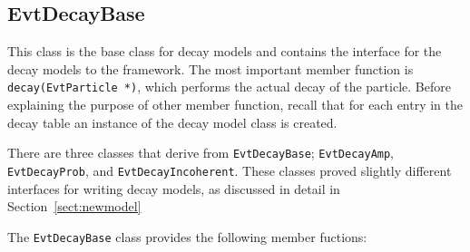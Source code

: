 \subsection{EvtDecayBase}

This class is the base class for decay models and contains the interface
for the decay models to the framework. The most important member
function is {\tt decay(EvtParticle *)}, which performs the actual 
decay of the particle. 
Before explaining the purpose of other
member function, recall that for each entry in the decay table
an instance of the decay model class is created. 


There are three classes that derive from {\tt EvtDecayBase};
{\tt EvtDecayAmp}, {\tt EvtDecayProb}, 
and {\tt EvtDecayIncoherent}. These classes proved slightly
different interfaces for writing decay models, as discussed in 
detail in Section~\ref{sect:newmodel}

The {\tt EvtDecayBase} class provides the following
member fuctions:


